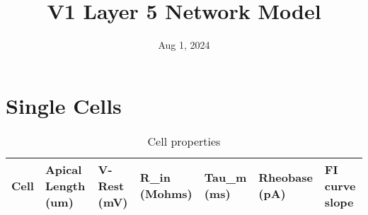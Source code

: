 \documentclass[12pt, letterpaper]{article}
\title{V1 Layer 5 Network Model}
\date{Aug 1, 2024}
\begin{document}
\pagestyle{empty} %
\maketitle
\thispagestyle{empty} %

\section*{Single Cells}

\begin{table}[H]
    \centering
    \caption{Cell properties}
    \begin{tabularx}{\textwidth}{|X|X|X|X|X|X|X|}
    \hline
    Cell & Apical Length (um) & V-Rest (mV) & R\_in (Mohms) & Tau\_m (ms) & Rheobase (pA) & FI curve slope \\ \hline
    \end{tabularx}
  \end{table}
\end{document}
